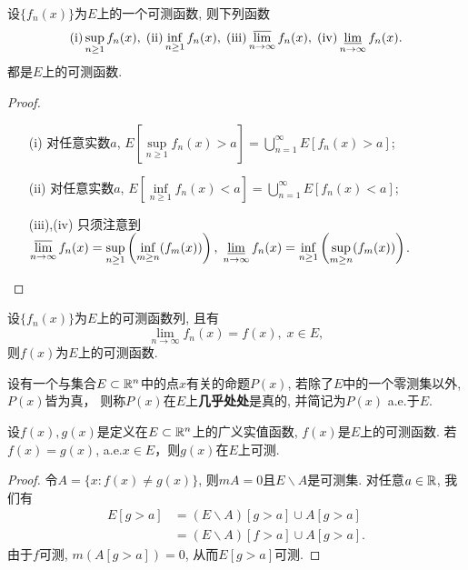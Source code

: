 \begin{theorem}[可测函数列的极限]
	设$\{ f_n(x) \}$为$E$上的一个可测函数, 则下列函数
	$$
		(\mathrm{i})   \sup\limits_{n \geq 1} f_n (x) , \;
		(\mathrm{ii})  \inf\limits_{n \geq 1} f_n (x) , \;
		(\mathrm{iii}) \varlimsup\limits_{n \to \infty} f_n (x), \;
		(\mathrm{iv})  \varliminf\limits_{n \to \infty} f_n (x). 
	$$
	都是$E$上的可测函数. 
\end{theorem}
\begin{proof}
	\begin{enumerate}
		\item[(i)]   对任意实数$a$, $E \left[\sup\limits_{n \geq 1} f_n (x) > a \right] = \bigcup\limits_{n = 1}^{\infty} E[f_n (x) > a]$; 
		\item[(ii)]  对任意实数$a$, $E \left[\inf\limits_{n \geq 1} f_n (x) < a \right] = \bigcup\limits_{n = 1}^{\infty} E[f_n (x) < a]$;
		\item[(iii),(iv)] 只须注意到$\varlimsup\limits_{n \to \infty} f_n (x) =  \sup\limits_{n \geq 1}\left(\inf\limits_{m \geq n}  (f_m (x))\right), \; \varliminf\limits_{n \to \infty} f_n (x) =  \inf\limits_{n \geq 1}\left(\sup\limits_{m \geq n}  (f_m (x))\right)$. 
	\end{enumerate}
\end{proof}
\begin{corollary}
	设$\{ f_n(x) \}$为$E$上的可测函数列, 且有
	$$
		\lim\limits_{n \to \infty} f_n(x) = f(x), \; x \in E,
	$$
	则$f(x)$为$E$上的可测函数.
\end{corollary}

\begin{definition}[几乎处处]
	设有一个与集合$E \subset \mathbb{R}^n$中的点$x$有关的命题$P(x)$, 
	若除了$E$中的一个零测集以外, $P(x)$皆为真，
	则称$P(x)$在$E$上\textbf{几乎处处}是真的, 
	并简记为$P(x)$ a.e.于$E$. 
\end{definition}

\begin{theorem}
	设$f(x),g(x)$是定义在$E \subset \mathbb{R}^n$上的广义实值函数, $f(x)$是$E$上的可测函数. 若$f(x) = g(x)$, a.e.$x \in E$，则$g(x)$在$E$上可测.
\end{theorem}
\begin{proof}
	令$A = \{ x: f(x) \neq g(x) \}$, 则$mA = 0$且$E \backslash A$是可测集. 
	对任意$a \in \mathbb{R}$, 我们有
	$$
	\begin{aligned}
		E[g > a] 
		& = (E \backslash A)[g>a] \cup A[g>a] \\
		& = (E \backslash A)[f>a] \cup A[g>a] .
	\end{aligned}
	$$
	由于$f$可测, $m(A[g>a]) = 0$, 从而$E[g > a]$可测. 
\end{proof}

